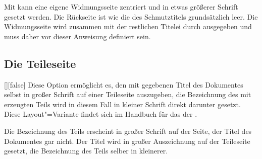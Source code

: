 \documentclass[%
  english,ngerman,%
  headings=optiontoheadandtoc,captions=tableheading,numbers=noenddot,%
  chapterpage,cdfoot,%
]{tudscrman}
\begin{document}
\begin{Declaration}{}
\begin{Declaration}{}
\begin{Declaration}{}
\begin{Declaration}{}
\begin{Declaration}{}
\begin{Declaration}{}
\begin{Declaration}{}
Mit  kann eine eigene Widmungsseite zentriert und in etwas 
größerer Schrift gesetzt werden. Die Rückseite ist wie die des Schmutztitels 
grundsätzlich leer. Die Widmungsseite wird zusammen mit der restlichen Titelei 
durch  ausgegeben und muss daher vor dieser Anweisung 
definiert sein.
\end{Declaration}
\end{Declaration}
\end{Declaration}
\end{Declaration}
\end{Declaration}
\end{Declaration}
\end{Declaration}

\clearpage
\subsection{Die Teileseite}\label{sec:part}
\begin{Declaration}{[\PBoolean]}[false]%
\printdeclarationlist%
%
%
Diese Option ermöglicht es, den mit  gegebenen Titel des 
Dokumentes selbst in großer Schrift auf einer Teileseite auszugeben, die 
Bezeichnung des mit  erzeugten Teils wird 
in diesem Fall in kleiner Schrift direkt darunter gesetzt. Diese 
Layout"=Variante findet sich im  Handbuch für das \CD der \TnUD. \notudscrartcl
\begin{values}
\itemfalse
  Die Bezeichnung des Teils erscheint in großer Schrift auf der Seite, der 
  Titel des Dokumentes gar nicht.
\itemtrue*
  Der Titel wird in großer Auszeichnung auf der Teileseite gesetzt, die 
  Bezeichnung des Teils selber in kleinerer.
\end{values}
\end{Declaration}
\end{document}
